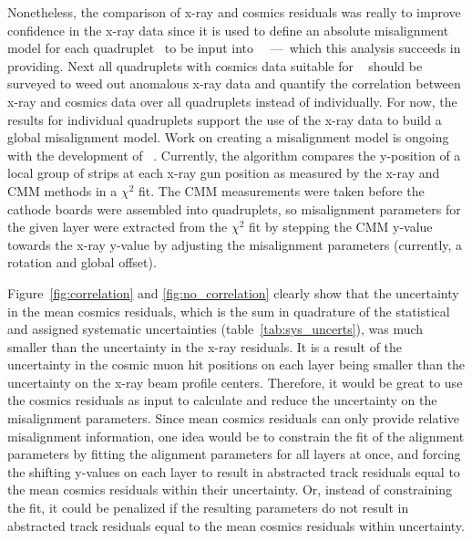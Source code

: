 Nonetheless, the comparison of x-ray and cosmics residuals was really to improve confidence in the x-ray data since it is used to define an absolute misalignment model for each quadruplet~\cite{lefebvre_precision_2020} to be input into ~\cite{the_atlas_collaboration_athena}~---~which this analysis succeeds in providing. Next all quadruplets with cosmics data suitable for ~\cite{lefebvre_tgc_analysis} should be surveyed to weed out anomalous x-ray data and quantify the correlation between x-ray and cosmics data over all quadruplets instead of individually. For now, the results for individual quadruplets support the use of the x-ray data to build a global misalignment model. Work on creating a misalignment model is ongoing with the development of ~\cite{lefebvre_stgc_as_built_fit}. Currently, the algorithm compares the y-position of a local group of strips at each x-ray gun position as measured by the x-ray and CMM methods in a $\chi^2$ fit. The CMM measurements were taken before the cathode boards were assembled into quadruplets, so misalignment parameters for the given layer were extracted from the $\chi^2$ fit by stepping the CMM y-value towards the x-ray y-value by adjusting the misalignment parameters (currently, a rotation and global offset). 

Figure~\ref{fig:correlation} and \ref{fig:no_correlation} clearly show that the uncertainty in the mean cosmics residuals, which is the sum in quadrature of the statistical and assigned systematic uncertainties (table~\ref{tab:sys_uncerts}), was much smaller than the uncertainty in the x-ray residuals. It is a result of the uncertainty in the cosmic muon hit positions on each layer being smaller than the uncertainty on the x-ray beam profile centers. Therefore, it would be great to use the cosmics residuals as input to calculate and reduce the uncertainty on the misalignment parameters. Since mean cosmics residuals can only provide relative misalignment information, one idea would be to constrain the fit of the alignment parameters by fitting the alignment parameters for all layers at once, and forcing the shifting y-values on each layer to result in abstracted track residuals equal to the mean cosmics residuals within their uncertainty. Or, instead of constraining the fit, it could be penalized if the resulting parameters do not result in abstracted track residuals equal to the mean cosmics residuals within uncertainty. 

